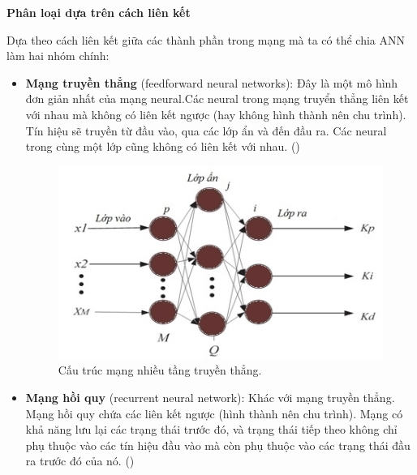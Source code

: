 	\textbf{Phân loại dựa trên cách liên kết} \par
	Dựa theo cách liên kết giữa các thành phần trong mạng mà ta có thể chia ANN làm hai nhóm chính:
	\begin{itemize}
		\item \textbf{Mạng truyền thẳng} (feedforward neural networks): Đây là một mô hình đơn giản nhất của mạng neural.Các neural trong mạng truyển thẳng liên kết với nhau mà không có liên kết ngược (hay không hình thành nên chu trình). Tín hiệu sẽ truyền từ đầu vào, qua các lớp ẩn và đến đầu ra. Các neural trong cùng một lớp cũng không có liên kết với nhau. ()
\begin{figure}[ht]
  			\begin{center}
    				
    				\includegraphics[scale=1]{nlayer}
    				\caption{Cấu trúc mạng nhiều tầng truyền thẳng.} 
    				\label{1layer}
  			\end{center}
\end{figure}
		\item \textbf{Mạng hồi quy} (recurrent neural network): Khác với mạng truyền thẳng. Mạng hồi quy chứa các liên kết ngược (hình thành nên chu trình). Mạng có khả năng lưu lại các trạng thái trước đó, và trạng thái tiếp theo không  chỉ phụ thuộc vào các tín hiệu đầu vào mà còn phụ thuộc vào các trạng thái đầu ra trước đó của nó. () 
	\end{itemize}
